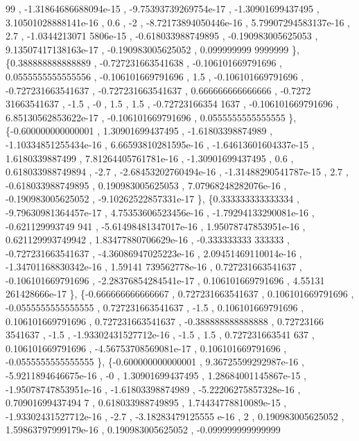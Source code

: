 \begin{DoxyCode}
      99 , -1.31864686688094e-15 , -9.75393739269754e-17 , -1.30901699437495 , 3.10501028888141e-16 ,             
        0.6 ,                -2 , -8.72173894050446e-16 , 5.79907294583137e-16 ,               2.7 , -1.0344213071
      5806e-15 , -0.618033988749895 , -0.190983005625053 , 9.13507417138163e-17 , -0.190983005625052 , 0.099999999
      9999999 \},
\{0.388888888888889 , -0.727231663541638 , -0.106101669791696 , 0.0555555555555556 , -0.106101669791696 ,   
                  1.5 , -0.106101669791696 , -0.727231663541637 , -0.727231663541637 , 0.666666666666666 , -0.7272
      31663541637 ,              -1.5 ,                -0 ,               1.5 ,               1.5 , -0.72723166354
      1637 , -0.106101669791696 , 6.85130562853622e-17 , -0.106101669791696 , 0.0555555555555555 \},
\{-0.600000000000001 ,  1.30901699437495 , -1.61803398874989 , -1.10334851255434e-16 , 6.66593810281595e-16 
      , -1.64613601604337e-15 ,   1.6180339887499 , 7.81264405761781e-16 , -1.30901699437495 ,               0.6 ,
       0.618033988749894 ,              -2.7 , -2.68453202760494e-16 , -1.31488290541787e-15 ,               2.7 ,
       -0.618033988749895 , 0.190983005625053 , 7.07968248282076e-16 , -0.190983005625052 , -9.10262522857331e-17 
      \},
\{0.333333333333334 , -9.79630981364457e-17 , 4.75353606523456e-16 , -1.79294133290081e-16 , -0.621129993749
      941 , -5.61498481347017e-16 , 1.95078747853951e-16 , 0.621129993749942 , 1.83477880706629e-16 , -0.333333333
      333333 , -0.727231663541637 , -4.36086947025223e-16 , 2.09451469110014e-16 , -1.34701168830342e-16 , 1.59141
      739562778e-16 , 0.727231663541637 , -0.106101669791696 , -2.28376854284541e-17 , 0.106101669791696 , 4.55131
      261428666e-17 \},
\{-0.666666666666667 , 0.727231663541637 , 0.106101669791696 , -0.0555555555555555 , 0.727231663541637 ,    
                -1.5 , 0.106101669791696 , 0.106101669791696 , 0.727231663541637 , -0.388888888888888 , 0.72723166
      3541637 ,              -1.5 , -1.93302431527712e-16 ,              -1.5 ,               1.5 , 0.727231663541
      637 , 0.106101669791696 , -4.56753708569081e-17 , 0.106101669791696 , -0.0555555555555555 \},
\{-0.600000000000001 , 9.36725599292987e-16 , -5.9211894646675e-16 ,                -0 ,  1.30901699437495 ,
       1.28684001145867e-15 , -1.95078747853951e-16 , -1.61803398874989 , -5.22206275857328e-16 , 0.70901699437494
      7 , 0.618033988749895 , 1.74434778810089e-15 , -1.93302431527712e-16 ,              -2.7 , -3.18283479125555
      e-16 ,                 2 , 0.190983005625052 , 1.59863797999179e-16 , 0.190983005625052 , -0.099999999999999

\end{DoxyCode}
